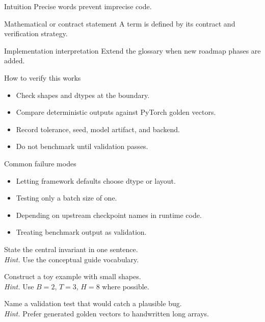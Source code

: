 \begin{intuitionbox}{Intuition}
Precise words prevent imprecise code.
\end{intuitionbox}

\begin{definitionbox}{Mathematical or contract statement}
A term is defined by its contract and verification strategy.
\end{definitionbox}

\begin{implementationbox}{Implementation interpretation}
Extend the glossary when new roadmap phases are added.
\end{implementationbox}

\begin{verificationbox}{How to verify this works}
\begin{itemize}
\item Check shapes and dtypes at the boundary.
\item Compare deterministic outputs against PyTorch golden vectors.
\item Record tolerance, seed, model artifact, and backend.
\item Do not benchmark until validation passes.
\end{itemize}
\end{verificationbox}

\begin{warningbox}{Common failure modes}
\begin{itemize}
\item Letting framework defaults choose dtype or layout.
\item Testing only a batch size of one.
\item Depending on upstream checkpoint names in runtime code.
\item Treating benchmark output as validation.
\end{itemize}
\end{warningbox}

\begin{chapterexercises}
\item State the central invariant in one sentence.\\
\textit{Hint.} Use the conceptual guide vocabulary.
\item Construct a toy example with small shapes.\\
\textit{Hint.} Use $B=2$, $T=3$, $H=8$ where possible.
\item Name a validation test that would catch a plausible bug.\\
\textit{Hint.} Prefer generated golden vectors to handwritten long arrays.
\end{chapterexercises}

